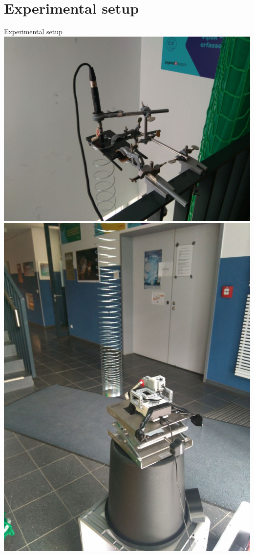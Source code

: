 \documentclass{beamer}
\begin{document}
\section {Experimental setup}
	\begin{frame}{Experimental setup}
		\includegraphics [scale=0.13]{images/setup_0.jpg}
		\includegraphics [scale=0.13]{images/setup_1.jpg}
	\end{frame}
\end{document}
